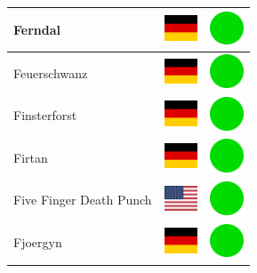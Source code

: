 \documentclass[12pt, a4paper, twoside]{report}
\begin{document}
\begin{center}
\begin{longtable}{|p{5cm}|p{2cm}|p{2cm}|}
Ferndal & \includegraphics[width=1cm]{4x3/de} & \includegraphics[width=1cm]{likes/y} \\ \hline
Feuerschwanz & \includegraphics[width=1cm]{4x3/de} & \includegraphics[width=1cm]{likes/y} \\ \hline
Finsterforst & \includegraphics[width=1cm]{4x3/de} & \includegraphics[width=1cm]{likes/y} \\ \hline
Firtan & \includegraphics[width=1cm]{4x3/de} & \includegraphics[width=1cm]{likes/y} \\ \hline
Five Finger Death Punch & \includegraphics[width=1cm]{4x3/us} & \includegraphics[width=1cm]{likes/y} \\ \hline
Fjoergyn & \includegraphics[width=1cm]{4x3/de} & \includegraphics[width=1cm]{likes/y} \\ \hline

\end{longtable}
\end{center}
\end{document}
